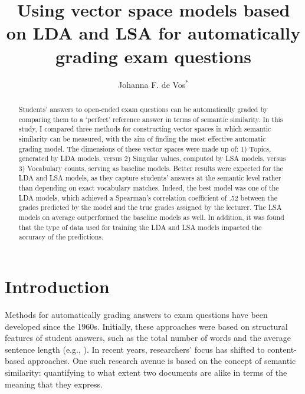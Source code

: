 \documentclass[a4paper,10pt,twoside]{article}
\begin{document}
\title{Using vector space models based on LDA and LSA for automatically grading exam questions}

\author{Johanna F. de Vos$^*$ 
\AND {}}


\maketitle\thispagestyle{empty} %


\begin{abstract}
Students' answers to open-ended exam questions can be automatically graded by comparing them to a `perfect' reference answer in terms of semantic similarity. In this study, I compared three methods for constructing vector spaces in which semantic similarity can be measured, with the aim of finding the most effective automatic grading model. The dimensions of these vector spaces were made up of: 1) Topics, generated by LDA models, versus 2) Singular values, computed by LSA models, versus 3) Vocabulary counts, serving as baseline models. Better results were expected for the LDA and LSA models, as they capture students' answers at the semantic level rather than depending on exact vocabulary matches. Indeed, the best model was one of the LDA models, which achieved a Spearman's correlation coefficient of .52 between the grades predicted by the model and the true grades assigned by the lecturer. The LSA models on average outperformed the baseline models as well. In addition, it was found that the type of data used for training the LDA and LSA models impacted the accuracy of the predictions.
\end{abstract}

\section{Introduction}

Methods for automatically grading answers to exam questions have been developed since the 1960s. Initially, these approaches were based on structural features of student answers, such as the total number of words and the average sentence length (e.g., ). In recent years, researchers' focus has shifted to content-based approaches. One such research avenue is based on the concept of semantic similarity: quantifying to what extent two documents are alike in terms of the meaning that they express.
\end{document}
